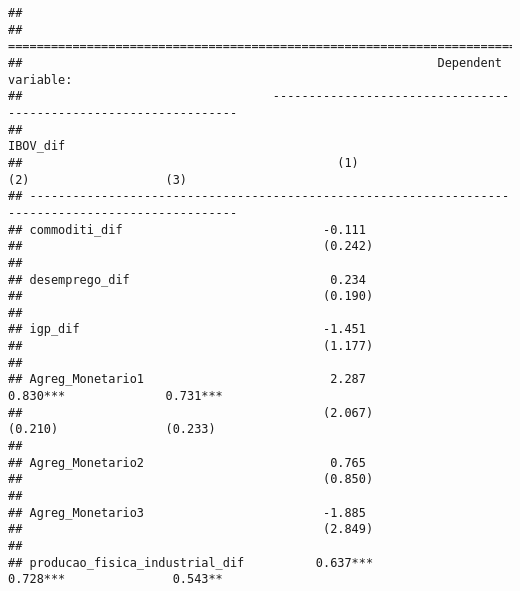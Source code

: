 \documentclass[
]{article}
\begin{document}
\begin{verbatim}
## 
## ===================================================================================================
##                                                          Dependent variable:                       
##                                   -----------------------------------------------------------------
##                                                               IBOV_dif                             
##                                            (1)                   (2)                   (3)         
## ---------------------------------------------------------------------------------------------------
## commoditi_dif                            -0.111                                                    
##                                          (0.242)                                                   
##                                                                                                    
## desemprego_dif                            0.234                                                    
##                                          (0.190)                                                   
##                                                                                                    
## igp_dif                                  -1.451                                                    
##                                          (1.177)                                                   
##                                                                                                    
## Agreg_Monetario1                          2.287               0.830***              0.731***       
##                                          (2.067)               (0.210)               (0.233)       
##                                                                                                    
## Agreg_Monetario2                          0.765                                                    
##                                          (0.850)                                                   
##                                                                                                    
## Agreg_Monetario3                         -1.885                                                    
##                                          (2.849)                                                   
##                                                                                                    
## producao_fisica_industrial_dif          0.637***              0.728***               0.543**       

\end{verbatim}
\end{document}
